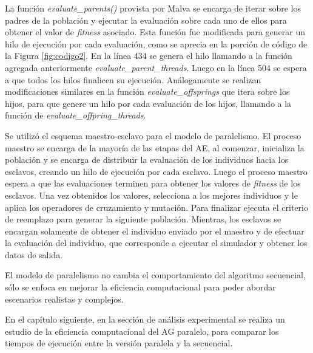 La función \emph{evaluate{\_}parents()} provista por Malva se encarga de iterar sobre los padres de la población y ejecutar la evaluación sobre cada uno de ellos para obtener el valor de \emph{fitness} asociado. Esta función fue modificada para generar un hilo de ejecución por cada evaluación, como se aprecia en la porción de código de la Figura \ref{fig:codigo2}.
En la línea 434  se genera el hilo llamando a la función agregada anteriormente \emph{evaluate{\_}parent{\_}threads}. Luego en la línea 504 se espera a que todos los hilos finalicen su ejecución.
Análogamente se realizan modificaciones similares en la función 	\emph{evaluate{\_}offsprings }que itera sobre los hijos, para que
genere un hilo por cada evaluación de los hijos, llamando a la función de  \emph{evaluate{\_}offpring{\_}threads}.
		
		

Se utilizó el esquema maestro-esclavo para el modelo de paralelismo. El proceso maestro se encarga de la mayoría de las etapas del AE, al comenzar, inicializa la población y se encarga de distribuir la evaluación de los individuos hacia los esclavos, creando un hilo de ejecución por cada esclavo. Luego el proceso maestro espera a que las evaluaciones terminen para obtener los valores de \emph{fitness} de los esclavos. Una vez obtenidos los valores, selecciona a los mejores individuos y le aplica los operadores de cruzamiento y mutación. Para finalizar ejecuta el criterio de reemplazo para generar la siguiente población. Mientras, los esclavos se encargan solamente de obtener el individuo enviado por el maestro y de efectuar la evaluación del individuo, que corresponde a ejecutar el simulador y obtener los datos de salida. 


El modelo de paralelismo no cambia el comportamiento del algoritmo secuencial, sólo se enfoca en mejorar la eficiencia computacional para poder abordar escenarios realistas y complejos.

En el capítulo siguiente, en la sección de análisis experimental se realiza un estudio de la eficiencia computacional del AG paralelo, para comparar los tiempos de ejecución entre la versión paralela y la secuencial.